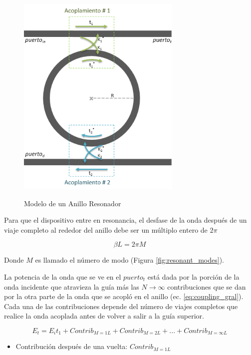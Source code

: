 \begin{figure}[h!]
\caption{Modelo de un Anillo Resonador}
\centering
\includegraphics[width=0.7\textwidth,natwidth=396,natheight=495]{figs/rr_model.PNG}
\label{fig:rr_model}
\end{figure} 

Para que el dispositivo entre en resonancia, el desfase de la onda después de un viaje
completo al rededor del anillo debe ser un múltiplo entero de $2 \pi$

\begin{equation}
\beta L = 2 \pi M
\label{eq:resonant_condition}
\end{equation} 
 
Donde $M$ es llamado el número de modo (Figura \ref{fig:resonant_modes}). 

La potencia de la onda que se ve en el $puerto_t$ está dada por la porción de la onda incidente
que atravieza la guía más las $N\to\infty$ contribuciones que se dan por la otra parte de la
onda que se acopló en el anillo (ec. \ref{eq:coupling_gral}). 
Cada una de las contribuciones depende del número de viajes completos que realice la onda
acoplada antes de volver a salir a la guía superior.


\begin{equation}
E_t = E_i t_1 + Contrib_{M=1L} + Contrib_{M=2L} + ... + Contrib_{M=\infty L}
\label{eq:coupling_gral}
\end{equation} 

\begin{itemize}
\item Contribución después de una vuelta: $Contrib_{M=1L}$
\end{itemize} 


